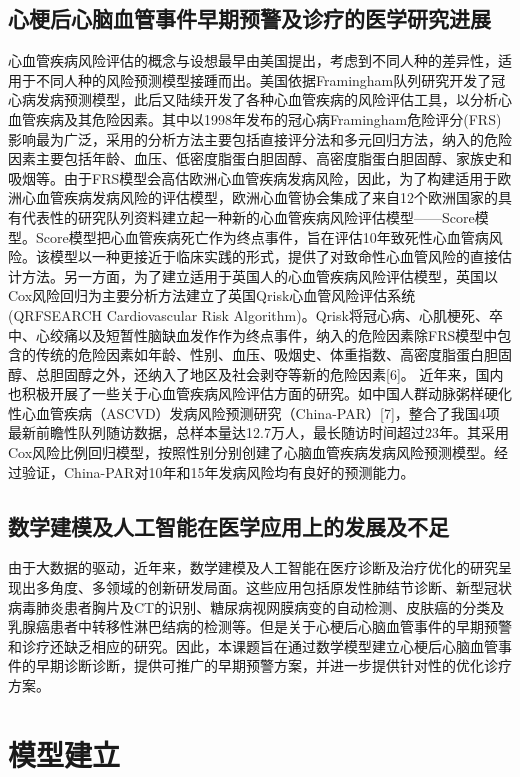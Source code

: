 \documentclass{article}
\begin{document}
\subsection{心梗后心脑血管事件早期预警及诊疗的医学研究进展}
心血管疾病风险评估的概念与设想最早由美国提出，考虑到不同人种的差异性，适用于不同人种的风险预测模型接踵而出。美国依据Framingham队列研究开发了冠心病发病预测模型，此后又陆续开发了各种心血管疾病的风险评估工具，以分析心血管疾病及其危险因素。其中以1998年发布的冠心病Framingham危险评分(FRS)影响最为广泛，采用的分析方法主要包括直接评分法和多元回归方法，纳入的危险因素主要包括年龄、血压、低密度脂蛋白胆固醇、高密度脂蛋白胆固醇、家族史和吸烟等。由于FRS模型会高估欧洲心血管疾病发病风险，因此，为了构建适用于欧洲心血管疾病发病风险的评估模型，欧洲心血管协会集成了来自12个欧洲国家的具有代表性的研究队列资料建立起一种新的心血管疾病风险评估模型——Score模型。Score模型把心血管疾病死亡作为终点事件，旨在评估10年致死性心血管病风险。该模型以一种更接近于临床实践的形式，提供了对致命性心血管风险的直接估计方法。另一方面，为了建立适用于英国人的心血管疾病风险评估模型，英国以Cox风险回归为主要分析方法建立了英国Qrisk心血管风险评估系统 (QRFSEARCH Cardiovascular Risk Algorithm)。Qrisk将冠心病、心肌梗死、卒中、心绞痛以及短暂性脑缺血发作作为终点事件，纳入的危险因素除FRS模型中包含的传统的危险因素如年龄、性别、血压、吸烟史、体重指数、高密度脂蛋白胆固醇、总胆固醇之外，还纳入了地区及社会剥夺等新的危险因素[6]。
近年来，国内也积极开展了一些关于心血管疾病风险评估方面的研究。如中国人群动脉粥样硬化性心血管疾病（ASCVD）发病风险预测研究（China-PAR）[7]，整合了我国4项最新前瞻性队列随访数据，总样本量达12.7万人，最长随访时间超过23年。其采用Cox风险比例回归模型，按照性别分别创建了心脑血管疾病发病风险预测模型。经过验证，China-PAR对10年和15年发病风险均有良好的预测能力。
\subsection{数学建模及人工智能在医学应用上的发展及不足}
由于大数据的驱动，近年来，数学建模及人工智能在医疗诊断及治疗优化的研究呈现出多角度、多领域的创新研发局面。这些应用包括原发性肺结节诊断、新型冠状病毒肺炎患者胸片及CT的识别、糖尿病视网膜病变的自动检测、皮肤癌的分类及乳腺癌患者中转移性淋巴结病的检测等。但是关于心梗后心脑血管事件的早期预警和诊疗还缺乏相应的研究。因此，本课题旨在通过数学模型建立心梗后心脑血管事件的早期诊断诊断，提供可推广的早期预警方案，并进一步提供针对性的优化诊疗方案。

\section{模型建立}
\end{document}
